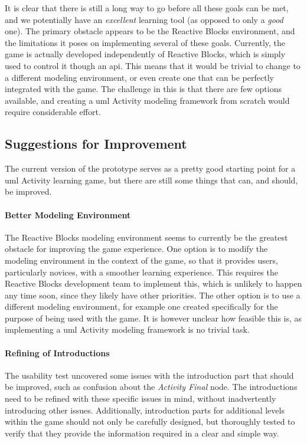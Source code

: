 \noindent
It is clear that there is still a long way to go before all these goals can be met, and we potentially have an \emph{excellent} learning tool (as opposed to only a \emph{good} one). The primary obstacle appears to be the Reactive Blocks environment, and the limitations it poses on implementing several of these goals. Currently, the game is actually developed independently of Reactive Blocks, which is simply used to control it though an \gls{api}. This means that it would be trivial to change to a different modeling environment, or even create one that can be perfectly integrated with the game. The challenge in this is that there are few options available, and creating a \gls{uml} Activity modeling framework from scratch would require considerable effort.

\subsection{Suggestions for Improvement}
\label{sec:game_improvement}
The current version of the prototype serves as a pretty good starting point for a \gls{uml} Activity learning game, but there are still some things that can, and should, be improved.

\paragraph{Better Modeling Environment} The Reactive Blocks modeling environment seems to currently be the greatest obstacle for improving the game experience. One option is to modify the modeling environment in the context of the game, so that it provides users, particularly novices, with a smoother learning experience. This requires the Reactive Blocks development team to implement this, which is unlikely to happen any time soon, since they likely have other priorities. The other option is to use a different modeling environment, for example one created specifically for the purpose of being used with the game. It is however unclear how feasible this is, as implementing a \gls{uml} Activity modeling framework is no trivial task.

\paragraph{Refining of Introductions} The usability test uncovered some issues with the introduction part that should be improved, such as confusion about the \emph{Activity Final} node. The introductions need to be refined with these specific issues in mind, without inadvertently introducing other issues. Additionally, introduction parts for additional levels within the game should not only be carefully designed, but thoroughly tested to verify that they provide the information required in a clear and simple way.

